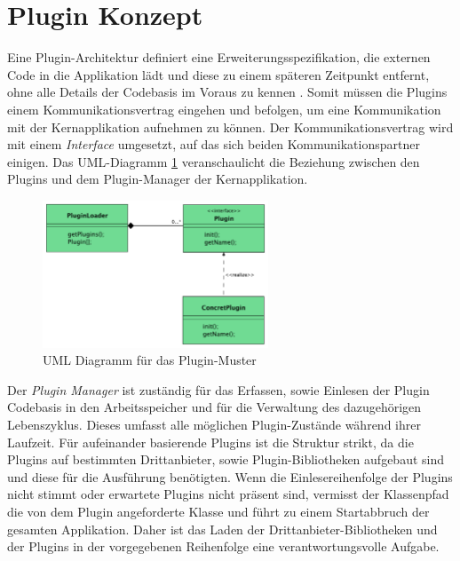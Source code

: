 \section{Plugin Konzept} \label{sec:pm}
  Eine Plugin-Architektur definiert eine Erweiterungsspezifikation, die externen Code in die Applikation lädt und diese zu einem späteren Zeitpunkt entfernt, ohne alle Details der Codebasis im Voraus zu kennen \cite{Duvigneau09}. Somit müssen die Plugins einem Kommunikationsvertrag eingehen und befolgen, um eine Kommunikation mit der Kernapplikation aufnehmen zu können. Der Kommunikationsvertrag wird mit einem \textit{Interface} umgesetzt, auf das sich beiden Kommunikationspartner einigen. Das UML-Diagramm \ref{fig:pluginUMLD} veranschaulicht die Beziehung zwischen den Plugins und dem Plugin-Manager der Kernapplikation. \bigbreak
  \begin{figure}[h!]
    \centering
    \includegraphics[width=0.6\textwidth]{material/images/pluginKonzept.pdf}
    \caption{UML Diagramm für das Plugin-Muster \cite{tubiblio36573}}
    \label{fig:pluginUMLD}
  \end{figure}
  Der \textit{Plugin Manager} ist zuständig für das Erfassen, sowie Einlesen der Plugin Codebasis in den Arbeitsspeicher und für die Verwaltung des dazugehörigen Lebenszyklus. Dieses umfasst alle möglichen Plugin-Zustände während ihrer Laufzeit. Für aufeinander basierende Plugins ist die Struktur strikt, da die Plugins auf bestimmten Drittanbieter, sowie Plugin-Bibliotheken aufgebaut sind und diese für die Ausführung benötigten. Wenn die Einlesereihenfolge der Plugins nicht stimmt oder erwartete Plugins nicht präsent sind, vermisst der Klassenpfad die von dem Plugin angeforderte Klasse und führt zu einem Startabbruch der gesamten Applikation. Daher ist das Laden der Drittanbieter-Bibliotheken und der Plugins in der vorgegebenen Reihenfolge eine verantwortungsvolle Aufgabe. \cite{tubiblio36573} 

